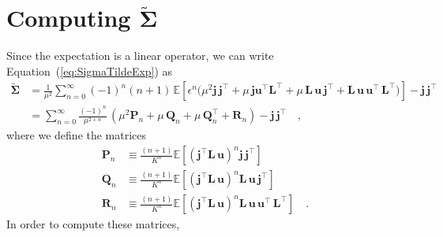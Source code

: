 \documentclass[modern]{aastex62}
\begin{document}
    \section{Computing $\tilde{\pmb{\Sigma}}$}
    Since the expectation is a linear operator, we can write Equation~(\ref{eq:SigmaTildeExp})
    as
    \begin{align}
        \tilde{\pmb{\Sigma}}
         & =
        \frac{1}{\mu^2}
        \sum\limits_{n=0}^\infty
        (-1)^n (n + 1)
        \,
        \mathbb{E}\left[
            \epsilon^n
            \Bigg(
            \mu^2 \mathbf{j} \, \mathbf{j}^\top
            +
            \mu \, \mathbf{j}\mathbf{u}^\top \mathbf{L}^\top
            +
            \mu \, \mathbf{L} \, \mathbf{u} \, \mathbf{j}^\top
            +
            \mathbf{L} \, \mathbf{u} \, \mathbf{u}^\top \, \mathbf{L}^\top
            \Bigg)
            \right]
        - \mathbf{j} \, \mathbf{j}^\top
        \nonumber \\[0.5em]
         & =
        \sum\limits_{n=0}^\infty
        \frac{(-1)^n}{\mu^{2 + n}}
        \,
        \left(
        \mu^2 \mathbf{P}_n
        +
        \mu \, \mathbf{Q}_n
        +
        \mu \, \mathbf{Q}_n^\top
        +
        \mathbf{R}_n
        \right)
        - \mathbf{j} \, \mathbf{j}^\top
        \quad,
    \end{align}
    where we define the matrices
    \begin{align}
        \mathbf{P}_n & \equiv \frac{(n + 1)}{K^n}\mathbb{E}\left[ \left(\mathbf{j}^\top \mathbf{L} \, \mathbf{u}\right)^n \mathbf{j} \, \mathbf{j}^\top \right]
        \nonumber                                                                                                                                                                                \\[0.5em]
        \mathbf{Q}_n & \equiv \frac{(n + 1)}{K^n}\mathbb{E}\left[ \left(\mathbf{j}^\top \mathbf{L} \, \mathbf{u}\right)^n \mathbf{L} \, \mathbf{u} \, \mathbf{j}^\top \right]
        \nonumber                                                                                                                                                                                \\[0.5em]
        \mathbf{R}_n & \equiv \frac{(n + 1)}{K^n}\mathbb{E}\left[ \left(\mathbf{j}^\top \mathbf{L} \, \mathbf{u}\right)^n \mathbf{L} \, \mathbf{u} \, \mathbf{u}^\top \, \mathbf{L}^\top \right]
        \quad.
    \end{align}
    In order to compute these matrices,
\end{document}

